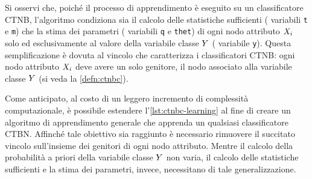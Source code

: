 Si osservi che, poiché il processo di apprendimento è eseguito su un classificatore \acs{CTNB}, l'algoritmo condiziona sia il calcolo delle statistiche sufficienti (\ie{} variabili \lstinline[]|t| e \lstinline[]|m|) che la stima dei parametri (\ie{} variabili \lstinline[]|q| e \lstinline[]|thet|) di ogni nodo attributo $\mathnormal{X}_i$ solo ed esclusivamente al valore della variabile classe $\mathnormal{Y}$ (\ie{} variabile \lstinline[]|y|). Questa semplificazione è dovuta al vincolo che caratterizza i classificatori \acs{CTNB}: ogni nodo attributo $\mathnormal{X}_i$ deve avere un solo genitore, il nodo associato alla variabile classe $\mathnormal{Y}$ (si veda la \autoref{defn:ctnbc}).

Come anticipato, al costo di un leggero incremento di complessità computazionale, è possibile estendere l'\autoref{lst:ctnbc-learning} al fine di creare un algoritmo di apprendimento generale che apprenda un qualsiasi classificatore \acs{CTBN}. Affinché tale obiettivo sia raggiunto è necessario rimuovere il succitato vincolo sull'insieme dei genitori di ogni nodo attributo. Mentre il calcolo della probabilità a priori della variabile classe $\mathnormal{Y}$ non varia, il calcolo delle statistiche sufficienti e la stima dei parametri, invece, necessitano di tale generalizzazione.

